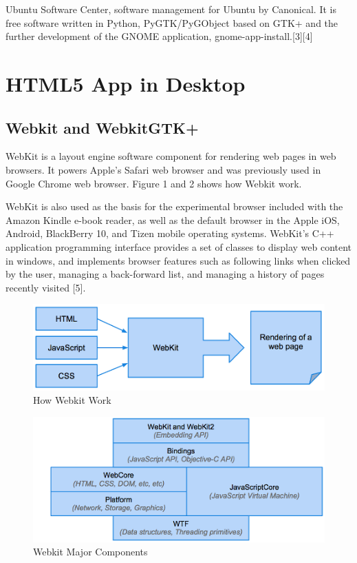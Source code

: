 \documentclass[conference, letterpaper]{IEEEtran}
\begin{document}
Ubuntu Software Center, software management for Ubuntu by Canonical. It is free software written in Python, PyGTK/PyGObject based on GTK+ and the further development of the GNOME application, gnome-app-install.[3][4]

\section{HTML5 App in Desktop}

\subsection{Webkit and WebkitGTK+}
WebKit is a layout engine software component for rendering web pages in web browsers. It powers Apple's Safari web browser and was previously used in Google Chrome web browser. Figure 1 and 2 shows how Webkit work.

WebKit is also used as the basis for the experimental browser included with the Amazon Kindle e-book reader, as well as the default browser in the Apple iOS, Android, BlackBerry 10, and Tizen mobile operating systems. WebKit's C++ application programming interface provides a set of classes to display web content in windows, and implements browser features such as following links when clicked by the user, managing a back-forward list, and managing a history of pages recently visited [5].

\begin{figure}[!t]
\centering
\includegraphics[scale=0.5]{image/webkit.png}
\caption{How Webkit Work}
\end{figure}

\begin{figure}[!t]
\centering
\includegraphics[scale=0.5]{image/webkitcomponents.png}
\caption{Webkit Major Components}
\end{figure}
\end{document}
